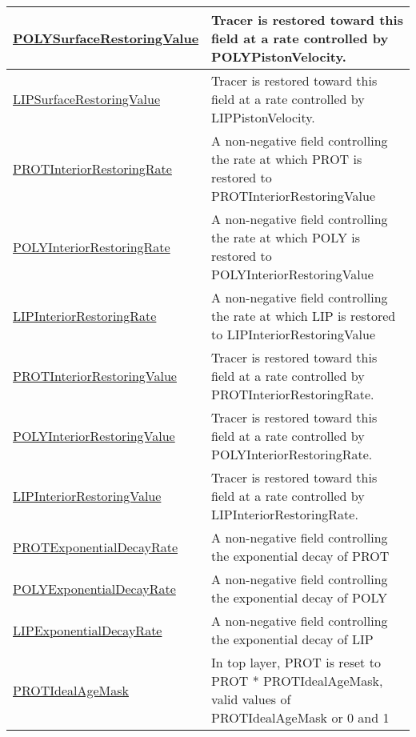 {\begin{center}
\begin{longtable}{| p{2.0in} | p{4.0in} |}
    \hline
    \hyperref[subsec:var_sec_forcing_POLYSurfaceRestoringValue]{POLYSurfaceRestoringValue} & Tracer is restored toward this field at a rate controlled by POLYPistonVelocity. \\
    \hline
    \hyperref[subsec:var_sec_forcing_LIPSurfaceRestoringValue]{LIPSurfaceRestoringValue} & Tracer is restored toward this field at a rate controlled by LIPPistonVelocity. \\
    \hline
    \hyperref[subsec:var_sec_forcing_PROTInteriorRestoringRate]{PROTInteriorRestoringRate} & A non-negative field controlling the rate at which PROT is restored to PROTInteriorRestoringValue \\
    \hline
    \hyperref[subsec:var_sec_forcing_POLYInteriorRestoringRate]{POLYInteriorRestoringRate} & A non-negative field controlling the rate at which POLY is restored to POLYInteriorRestoringValue \\
    \hline
    \hyperref[subsec:var_sec_forcing_LIPInteriorRestoringRate]{LIPInteriorRestoringRate} & A non-negative field controlling the rate at which LIP is restored to LIPInteriorRestoringValue \\
    \hline
    \hyperref[subsec:var_sec_forcing_PROTInteriorRestoringValue]{PROTInteriorRestoringValue} & Tracer is restored toward this field at a rate controlled by PROTInteriorRestoringRate. \\
    \hline
    \hyperref[subsec:var_sec_forcing_POLYInteriorRestoringValue]{POLYInteriorRestoringValue} & Tracer is restored toward this field at a rate controlled by POLYInteriorRestoringRate. \\
    \hline
    \hyperref[subsec:var_sec_forcing_LIPInteriorRestoringValue]{LIPInteriorRestoringValue} & Tracer is restored toward this field at a rate controlled by LIPInteriorRestoringRate. \\
    \hline
    \hyperref[subsec:var_sec_forcing_PROTExponentialDecayRate]{PROTExponentialDecayRate} & A non-negative field controlling the exponential decay of PROT \\
    \hline
    \hyperref[subsec:var_sec_forcing_POLYExponentialDecayRate]{POLYExponentialDecayRate} & A non-negative field controlling the exponential decay of POLY \\
    \hline
    \hyperref[subsec:var_sec_forcing_LIPExponentialDecayRate]{LIPExponentialDecayRate} & A non-negative field controlling the exponential decay of LIP \\
    \hline
    \hyperref[subsec:var_sec_forcing_PROTIdealAgeMask]{PROTIdealAgeMask} & In top layer, PROT is reset to PROT * PROTIdealAgeMask, valid values of PROTIdealAgeMask or 0 and 1 \\

\end{longtable}
\end{center}}
